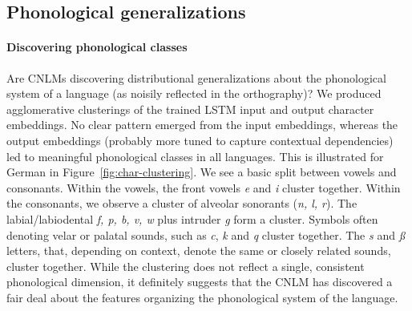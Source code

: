 
\subsection{Phonological generalizations}

\paragraph{Discovering phonological classes} Are CNLMs discovering distributional
generalizations about the phonological system of a language (as
noisily reflected in the orthography)? We
produced agglomerative clusterings of the
trained LSTM  input and output character embeddings. No clear pattern
emerged from the input embeddings, whereas the output
embeddings (probably more tuned to capture contextual dependencies)
led to meaningful phonological classes in all languages. This is illustrated for
German in Figure~\ref{fig:char-clustering}. We see a basic split
between vowels and consonants. Within the vowels, the front vowels
\emph{e} and \emph{i} cluster together. Within the consonants, we
observe a cluster of alveolar sonorants (\emph{n, l, r}). The
labial/labiodental \emph{f, p, b, v, w} plus intruder \emph{g}
form a cluster. Symbols often denoting velar or palatal sounds, such
as \emph{c}, \emph{k} and \emph{q} cluster together. The \emph{s} and \emph{{\ss}} letters, that, depending on context, denote the same
or closely related sounds, cluster together. While the
 clustering does not reflect a single,
consistent phonological dimension, it definitely suggests that the
CNLM has discovered a fair deal about the features organizing the
phonological system of the language.



